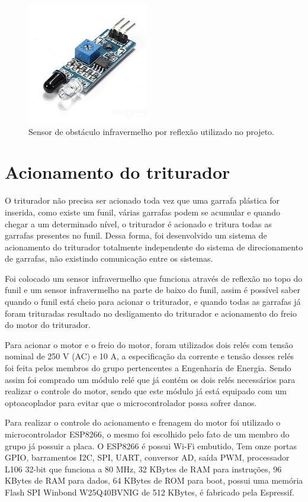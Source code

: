 \begin{figure}[!ht]
	\centering
		\includegraphics[scale=0.7]{figuras/eletronica/18-Sensor-de-obstaculo-infravermelho.jpg}
	\caption{Sensor de obstáculo infravermelho por reflexão utilizado no projeto.}
\end{figure}

\section{Acionamento do triturador}
O triturador não precisa ser acionado toda vez que uma garrafa plástica for inserida, como existe um funil, várias garrafas podem se acumular e quando chegar a um determinado nível, o triturador é acionado e tritura todas as garrafas presentes no funil. Dessa forma, foi desenvolvido um sistema de acionamento do triturador totalmente independente do sistema de direcionamento de garrafas, não existindo comunicação entre os sistemas.

Foi colocado um sensor infravermelho que funciona através de reflexão no topo do funil e um sensor infravermelho na parte de baixo do funil, assim é possível saber quando o funil está cheio para acionar o triturador, e quando todas as garrafas já foram trituradas resultado no desligamento do triturador e acionamento do freio do motor do triturador.

Para acionar o motor e o freio do motor, foram utilizados dois relés com tensão nominal de 250 V (AC) e 10 A, a especificação da corrente e tensão desses relés foi feita pelos membros do grupo pertencentes a Engenharia de Energia. Sendo assim foi comprado um módulo relé que já contém os dois relés necessários para realizar o controle do motor, sendo que este módulo já está equipado com um optoacoplador para evitar que o microcontrolador possa sofrer danos.

Para realizar o controle do acionamento e frenagem do motor foi utilizado o microcontrolador ESP8266, o mesmo foi escolhido pelo fato de um membro do grupo já possuir a placa. O ESP8266 é possui Wi-Fi embutido, Tem onze portas GPIO, barramentos I2C, SPI, UART, conversor AD, saída PWM, processador L106 32-bit que funciona a 80 MHz, 32 KBytes de RAM para instruções, 96 KBytes de RAM para dados, 64 KBytes de ROM para boot, possui uma memória Flash SPI Winbond W25Q40BVNIG de 512 KBytes, é fabricado pela Espressif. \cite{microESP}

